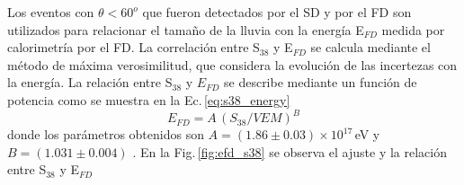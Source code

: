 Los eventos con $\theta<60^o$  que fueron detectados por el SD y por el FD son utilizados para relacionar el tamaño de la lluvia con la energía  E$_{FD}$ medida por calorimetría por el FD.  La correlación entre S$_{38}$ y E$_{FD}$ se calcula mediante el método de máxima verosimilitud, que considera la evolución de las incertezas con la energía. La relación entre S$_{38}$ y $E_{FD}$ se describe mediante un función de potencia como se muestra en la Ec.\,\ref{eq:s38_energy}
\begin{equation}
	E_{FD}= A\, (S_{38}/VEM)^B
	\label{eq:s38_energy}
\end{equation}
donde los parámetros obtenidos son $A=(1.86\pm0.03)\times 10^{17}\,$eV y $B=(1.031\pm0.004)$  \cite{tobepublished}. En la Fig.\,\ref{fig:efd_s38} se observa el ajuste y la relación entre  S$_{38}$ y E$_{FD}$


